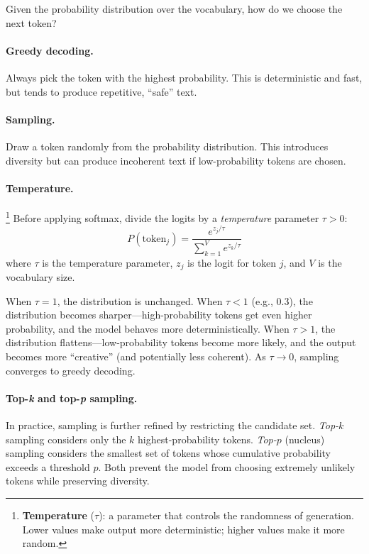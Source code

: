 %
Given the probability distribution over the vocabulary, how do we choose the next token?

\paragraph{Greedy decoding.} Always pick the token with the highest probability. This is deterministic and fast, but tends to produce repetitive, ``safe'' text.

\paragraph{Sampling.} Draw a token randomly from the probability distribution. This introduces diversity but can produce incoherent text if low-probability tokens are chosen.

\paragraph{Temperature.}\footnote{\textbf{Temperature} ($\tau$): a parameter that controls the randomness of generation. Lower values make output more deterministic; higher values make it more random.} Before applying softmax, divide the logits by a \emph{temperature} parameter $\tau > 0$:
\begin{equation}
\label{eq:temperature}
P(\text{token}_j) = \frac{e^{z_j / \tau}}{\sum_{k=1}^{V} e^{z_k / \tau}}
\end{equation}
where $\tau$ is the temperature parameter, $z_j$ is the logit for token $j$, and $V$ is the vocabulary size.

When $\tau = 1$, the distribution is unchanged. When $\tau < 1$ (e.g., 0.3), the distribution becomes sharper---high-probability tokens get even higher probability, and the model behaves more deterministically. When $\tau > 1$, the distribution flattens---low-probability tokens become more likely, and the output becomes more ``creative'' (and potentially less coherent). As $\tau \to 0$, sampling converges to greedy decoding.

\paragraph{Top-\emph{k} and top-\emph{p} sampling.} In practice, sampling is further refined by restricting the candidate set. \emph{Top-$k$} sampling considers only the $k$ highest-probability tokens. \emph{Top-$p$} (nucleus) sampling considers the smallest set of tokens whose cumulative probability exceeds a threshold $p$. Both prevent the model from choosing extremely unlikely tokens while preserving diversity.

